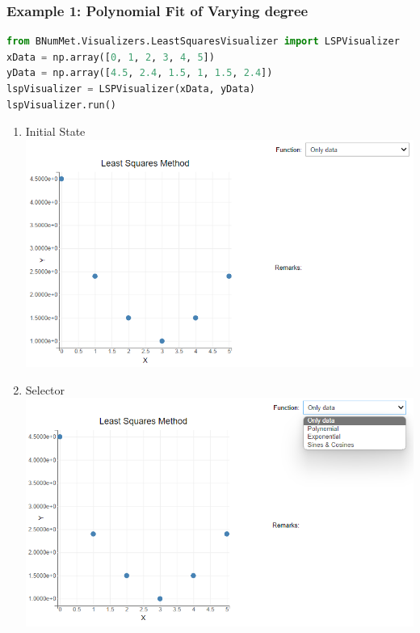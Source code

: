 \subsubsection{Example 1: Polynomial Fit of Varying degree}{
\begin{lstlisting}[language=Python]
from BNumMet.Visualizers.LeastSquaresVisualizer import LSPVisualizer
xData = np.array([0, 1, 2, 3, 4, 5])
yData = np.array([4.5, 2.4, 1.5, 1, 1.5, 2.4])
lspVisualizer = LSPVisualizer(xData, yData)
lspVisualizer.run()
\end{lstlisting}

\begin{enumerate}
    \item Initial State\\
    \includegraphics[scale=0.6]{Include/Images/Thesis/Documentation/Visualizers/LeastSquares/Example 1/Example 1 - 00 - Initial State.png}
    \item Selector\\
    \includegraphics[scale=0.6]{Include/Images/Thesis/Documentation/Visualizers/LeastSquares/Example 1/Example 1 - 00 - Selector.png}

\end{enumerate}}
